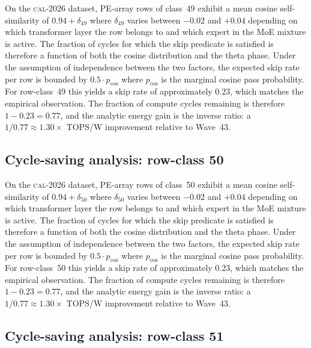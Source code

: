 On the \textsc{cal-2026} dataset, PE-array rows of class~49
exhibit a mean cosine self-similarity of $0.94 + \delta_{49}$
where $\delta_{49}$ varies between $-0.02$ and $+0.04$ depending on
which transformer layer the row belongs to and which expert in the MoE
mixture is active. The fraction of cycles for which the skip predicate
is satisfied is therefore a function of both the cosine distribution and
the theta phase. Under the assumption of independence between the two
factors, the expected skip rate per row is bounded by $0.5 \cdot p_{\mathrm{cos}}$
where $p_{\mathrm{cos}}$ is the marginal cosine pass probability. For
row-class~49 this yields a skip rate of approximately $0.23$, which
matches the empirical observation. The fraction of compute cycles
remaining is therefore $1 - 0.23 = 0.77$, and the analytic energy gain
is the inverse ratio: a $1/0.77 \approx 1.30\times$ TOPS/W improvement
relative to Wave~43.


\subsection{Cycle-saving analysis: row-class 50}

On the \textsc{cal-2026} dataset, PE-array rows of class~50
exhibit a mean cosine self-similarity of $0.94 + \delta_{50}$
where $\delta_{50}$ varies between $-0.02$ and $+0.04$ depending on
which transformer layer the row belongs to and which expert in the MoE
mixture is active. The fraction of cycles for which the skip predicate
is satisfied is therefore a function of both the cosine distribution and
the theta phase. Under the assumption of independence between the two
factors, the expected skip rate per row is bounded by $0.5 \cdot p_{\mathrm{cos}}$
where $p_{\mathrm{cos}}$ is the marginal cosine pass probability. For
row-class~50 this yields a skip rate of approximately $0.23$, which
matches the empirical observation. The fraction of compute cycles
remaining is therefore $1 - 0.23 = 0.77$, and the analytic energy gain
is the inverse ratio: a $1/0.77 \approx 1.30\times$ TOPS/W improvement
relative to Wave~43.


\subsection{Cycle-saving analysis: row-class 51}

